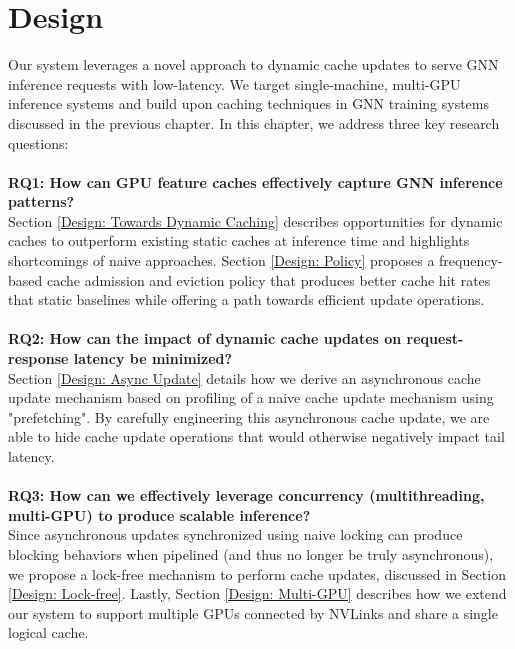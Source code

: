 \chapter{Design}
Our system leverages a novel approach to dynamic cache updates to serve GNN inference requests with low-latency. 
We target single-machine, multi-GPU inference systems and build upon caching techniques in GNN training systems discussed in the previous chapter. 
In this chapter, we address three key research questions:
\\ \\
\noindent \textbf{RQ1: How can GPU feature caches effectively capture GNN inference patterns?} \\
Section \ref{Design: Towards Dynamic Caching} describes opportunities for dynamic caches to outperform existing static caches at inference time and highlights shortcomings of naive approaches. Section \ref{Design: Policy} proposes a frequency-based cache admission and eviction policy that produces better cache hit rates that static baselines while offering a path towards efficient update operations.
\\ \\
\noindent \textbf{RQ2: How can the impact of dynamic cache updates on request-response latency be minimized?} \\
Section \ref{Design: Async Update} details how we derive an asynchronous cache update mechanism based on profiling of a naive cache update mechanism using "prefetching". By carefully engineering this asynchronous cache update, we are able to hide cache update operations that would otherwise negatively impact tail latency.
\\ \\
\noindent \textbf{RQ3: How can we effectively leverage concurrency (multithreading, multi-GPU) to produce scalable inference?} \\
Since asynchronous updates synchronized using naive locking can produce blocking behaviors when pipelined (and thus no longer be truly asynchronous), we propose a lock-free mechanism to perform cache updates, discussed in Section \ref{Design: Lock-free}.
Lastly, Section \ref{Design: Multi-GPU} describes how we extend our system to support multiple GPUs connected by NVLinks and share a single logical cache.

